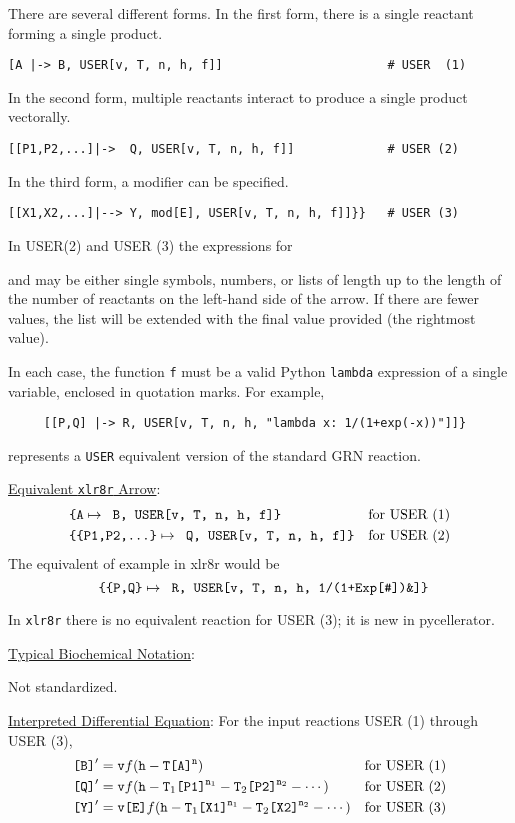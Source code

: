 There are several different forms. In the first form, there is a single reactant forming a single product. 
\begin{lstlisting}
[A |-> B, USER[v, T, n, h, f]]                       # USER  (1)
\end{lstlisting}
In the second form, multiple  reactants interact to produce a single product vectorally. 
\begin{lstlisting}
[[P1,P2,...]|->  Q, USER[v, T, n, h, f]]             # USER (2)
\end{lstlisting}
In the third form, a modifier can be specified.
\begin{lstlisting}
[[X1,X2,...]|--> Y, mod[E], USER[v, T, n, h, f]]}}   # USER (3)
\end{lstlisting}
In USER(2) and  USER (3) the expressions for { and  may be either single symbols, numbers, or lists of length up to the length of the number of reactants on the left-hand side of the arrow. If there are fewer values, the list will be extended with the final value provided (the rightmost value). 

In each case, the function {\tt f} must be a valid Python {\tt lambda} expression of a single variable, enclosed in quotation marks. For example, 
\begin{lstlisting}
     [[P,Q] |-> R, USER[v, T, n, h, "lambda x: 1/(1+exp(-x))"]]}
\end{lstlisting}
represents a {\tt USER} equivalent version of the standard GRN reaction. 


\underline{Equivalent {\tt xlr8r} Arrow}: 
\begin{align*}
& \text{\tt{\{A}} \mapsto \text{\tt{ B, USER[v, T, n, h, f]\}}}            &\text{for USER (1)}\\
& \text{\tt{\{\{P1,P2,...\}}} \mapsto \text{\tt{  Q, USER[v, T, n, h, f]\}}} &\text{for USER (2)}
\end{align*}
The equivalent of example in xlr8r would be
\begin{equation*}
\text{\tt{ \{\{P,Q\}}} \mapsto \text{\tt{ R, USER[v, T, n, h, 1/(1+Exp[\#])\&]\}}}
\end{equation*}

In {\tt xlr8r} there is no equivalent reaction for USER (3); it is new in pycellerator. 

\underline{Typical Biochemical Notation}: 

Not standardized.

\underline{Interpreted Differential Equation}:
For the input reactions USER (1) through USER (3),  
\begin{align*}
&\text{\tt{[B]}}' = \text{\tt{v}} f(\text{\tt{h}}-\text{\tt{T}} \text{\tt{[A]}}^{\text{\tt{n}}}) &\text{for USER (1)}\\
&\text{\tt{[Q]}}' = \text{\tt{v}} f(\text{\tt{h}}-\text{\tt{T}}_1 \text{\tt{[P1]}}^{\text{\tt{n}}_1}-\text{\tt{T}}_2 \text{\tt{[P2]}}^{\text{\tt{n}}_2}-\cdots) &\text{for USER (2)}\\
&\text{\tt{[Y]}}' = \text{\tt{v[E]}} f(\text{\tt{h}}-\text{\tt{T}}_1 \text{\tt{[X1]}}^{\text{\tt{n}}_1}-\text{\tt{T}}_2 \text{\tt{[X2]}}^{\text{\tt{n}}_2}-\cdots) &\text{for USER (3)}
\end{align*}

}
